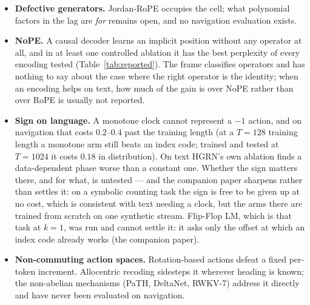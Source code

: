 \documentclass[11pt]{article}
\begin{document}
\begin{itemize}
  \textbf{The prior question is why a growing accumulator should cost anything at
  all}, given that the code is periodic. The natural answer --- that low-frequency
  channels reach phases never trained --- is the long-context literature's
  critical-dimension account, and its transposition to a one-layer path-integrated
  model was \textbf{refuted} (the companion paper): ablating those channels costs
  \emph{more} at extrapolated length, not less. So $\alpha$'s association with OOD degradation is
  established and its route is not. Until that is answered, $\alpha$
  \emph{unifies} the sign and rank results and \emph{diagnoses} what a task
  demanded, and it does not explain.
\item \textbf{Defective generators.} Jordan-RoPE occupies the cell; what polynomial
  factors in the lag are \emph{for} remains open, and no navigation evaluation exists.
\item \textbf{NoPE.} A causal decoder learns an implicit position without any operator
  at all, and in at least one controlled ablation it has the best perplexity of every
  encoding tested (Table~\ref{tab:reported}). The frame classifies operators and has
  nothing to say about the case where the right operator is the identity; when an
  encoding helps on text, how much of the gain is over NoPE rather than over RoPE is
  usually not reported.
\item \textbf{Sign on language.} A monotone clock cannot represent a $-1$ action, and
  on navigation that costs $0.2$--$0.4$ past the training length (at a $T=128$ training
  length a monotone arm still beats an index code; trained and tested at $T=1024$ it
  costs $0.18$ in distribution). On text HGRN's own ablation finds a
  data-dependent phase worse than a constant one. Whether the sign matters there, and
  for what, is untested --- and the companion paper sharpens rather than settles
  it: on a symbolic counting task the sign is free to be given up at no cost, which is
  consistent with text needing a clock, but the arms there are trained from scratch
  on one synthetic stream. Flip-Flop LM, which is that task at $k=1$, was run and
  cannot settle it: it asks only the offset at which an index code already works
  (the companion paper).
\item \textbf{Non-commuting action spaces.} Rotation-based actions defeat a fixed
  per-token increment. Allocentric recoding sidesteps it wherever heading is known;
  the non-abelian mechanisms (PaTH, DeltaNet, RWKV-7) address it directly and have
  never been evaluated on navigation.
\end{itemize}
\end{document}
